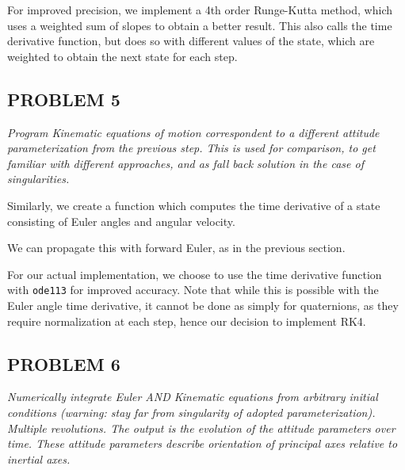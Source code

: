 

For improved precision, we implement a 4th order Runge-Kutta method, which uses a weighted sum of slopes to obtain a better result. This also calls the time derivative function, but does so with different values of the state, which are weighted to obtain the next state for each step.




\subsection{PROBLEM 5}
\textit{Program Kinematic equations of motion correspondent to a different attitude parameterization from the previous step. This is used for comparison, to get familiar with different approaches, and as fall back solution in the case of singularities.}

Similarly, we create a function which computes the time derivative of a state consisting of Euler angles and angular velocity.



We can propagate this with forward Euler, as in the previous section.



For our actual implementation, we choose to use the time derivative function with \texttt{ode113} for improved accuracy. Note that while this is possible with the Euler angle time derivative, it cannot be done as simply for quaternions, as they require normalization at each step, hence our decision to implement RK4.


\subsection{PROBLEM 6}
\textit{Numerically integrate Euler AND Kinematic equations from arbitrary initial conditions (warning: stay far from singularity of adopted parameterization). Multiple revolutions. The output is the evolution of the attitude parameters over time. These attitude parameters describe orientation of principal axes relative to inertial axes.}

